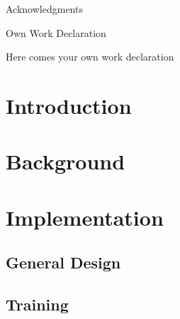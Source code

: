 \documentclass[11pt,twoside]{article}
\numberwithin{Theorem}{section}
\numberwithin{Definition}{section}
\numberwithin{Lemma}{section}
\numberwithin{Algorithm}{section}
\numberwithin{equation}{section}
\begin{document}
\begin{center}
\Large{Acknowledgments}
\end{center}


\clearpage

\begin{center}
\Large{Own Work Declaration}
\end{center}

Here comes your own work declaration

\cleardoublepage



\pagestyle{plain}
\setcounter{page}{1}

\tableofcontents
\clearpage
\listoftables
\listoffigures
\cleardoublepage

\setcounter{page}{1}

\nocite{*}
% 

\clearpage
\section{Introduction}
\label{sec:introduction}





\clearpage
\section{Background}
\label{sec:background}







\clearpage

\section{Implementation}

\subsection{General Design}

\subsection{Training}
\end{document}

